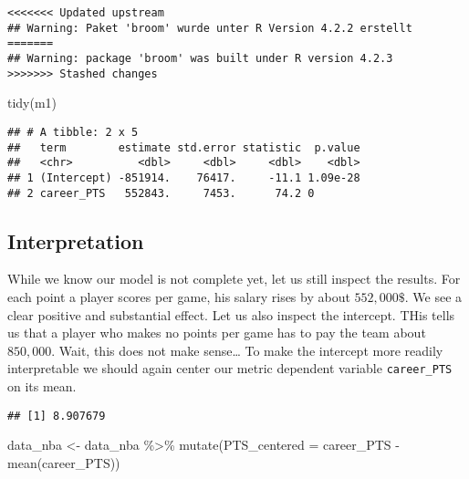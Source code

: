 \documentclass[
]{book}
\newenvironment{Shaded}{\begin{snugshade}}{\end{snugshade}}
\newcommand{\AttributeTok}[1]{\textcolor[rgb]{0.77,0.63,0.00}{#1}}
\newcommand{\AttributeTok}[1]{\textcolor[rgb]{0.13,0.29,0.53}{#1}}
\newcommand{\FunctionTok}[1]{\textcolor[rgb]{0.00,0.00,0.00}{#1}}
\newcommand{\FunctionTok}[1]{\textcolor[rgb]{0.13,0.29,0.53}{\textbf{#1}}}
\newcommand{\NormalTok}[1]{#1}
\newcommand{\OtherTok}[1]{\textcolor[rgb]{0.56,0.35,0.01}{#1}}
\newcommand{\SpecialCharTok}[1]{\textcolor[rgb]{0.00,0.00,0.00}{#1}}
\newcommand{\SpecialCharTok}[1]{\textcolor[rgb]{0.81,0.36,0.00}{\textbf{#1}}}
\begin{document}
\begin{verbatim}
<<<<<<< Updated upstream
## Warning: Paket 'broom' wurde unter R Version 4.2.2 erstellt
=======
## Warning: package 'broom' was built under R version 4.2.3
>>>>>>> Stashed changes
\end{verbatim}

\begin{Shaded}
\begin{Highlighting}[]
\FunctionTok{tidy}\NormalTok{(m1)}
\end{Highlighting}
\end{Shaded}

\begin{verbatim}
## # A tibble: 2 x 5
##   term        estimate std.error statistic  p.value
##   <chr>          <dbl>     <dbl>     <dbl>    <dbl>
## 1 (Intercept) -851914.    76417.     -11.1 1.09e-28
## 2 career_PTS   552843.     7453.      74.2 0
\end{verbatim}

\hypertarget{interpretation-1}{%
\subsection{Interpretation}\label{interpretation-1}}

While we know our model is not complete yet, let us still inspect the results.
For each point a player scores per game, his salary rises by about \(552,000\$\).
We see a clear positive and substantial effect. Let us also inspect the
intercept. THis tells us that a player who makes no points per game has to pay
the team about \(850,000\). Wait, this does not make sense\ldots{}
To make the intercept more readily interpretable we should again center our
metric dependent variable \texttt{career\_PTS} on its mean.

\begin{Shaded}
\end{Shaded}

\begin{verbatim}
## [1] 8.907679
\end{verbatim}

\begin{Shaded}
\begin{Highlighting}[]
\NormalTok{data\_nba }\OtherTok{\textless{}{-}}\NormalTok{ data\_nba }\SpecialCharTok{\%\textgreater{}\%} 
  \FunctionTok{mutate}\NormalTok{(}\AttributeTok{PTS\_centered =}\NormalTok{ career\_PTS }\SpecialCharTok{{-}} \FunctionTok{mean}\NormalTok{(career\_PTS))}
\end{Highlighting}
\end{Shaded}
\end{document}
